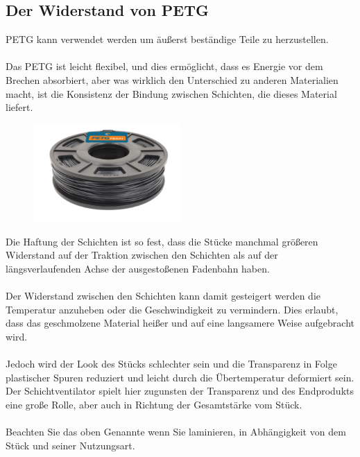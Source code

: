 \documentclass[11pt,a4paper]{article}
\begin{document}
	\subsection{Der Widerstand von PETG}PETG kann verwendet werden um äußerst beständige Teile zu herzustellen.
\\\\
Das PETG ist leicht flexibel, und dies ermöglicht, dass es Energie vor dem Brechen absorbiert, aber was wirklich den Unterschied zu anderen Materialien macht, ist die Konsistenz der Bindung zwischen Schichten, die dieses Material liefert.
\begin{figure}[H]
\centering
\includegraphics[width=0.5\textwidth,cfbox=azul_marcos 1pt 0pt]{FOTOS/PETG250NEGRO}
\end{figure}
Die Haftung der Schichten ist so fest, dass die Stücke manchmal größeren Widerstand auf der Traktion zwischen den Schichten als auf der längsverlaufenden Achse der ausgestoßenen Fadenbahn haben.
\\\\Der Widerstand zwischen den Schichten kann damit gesteigert werden die Temperatur anzuheben oder die Geschwindigkeit zu vermindern. Dies erlaubt, dass das geschmolzene Material heißer und auf eine langsamere Weise aufgebracht wird.
\\\\Jedoch wird der Look des Stücks schlechter sein und die Transparenz in Folge plastischer Spuren reduziert und leicht durch die Übertemperatur deformiert sein. Der Schichtventilator spielt hier zugunsten der Transparenz und des Endprodukts eine große Rolle, aber auch in Richtung der Gesamtstärke vom Stück.
\\\\Beachten Sie das oben Genannte wenn Sie laminieren, in Abhängigkeit von dem Stück und seiner Nutzungsart.
\end{document}
